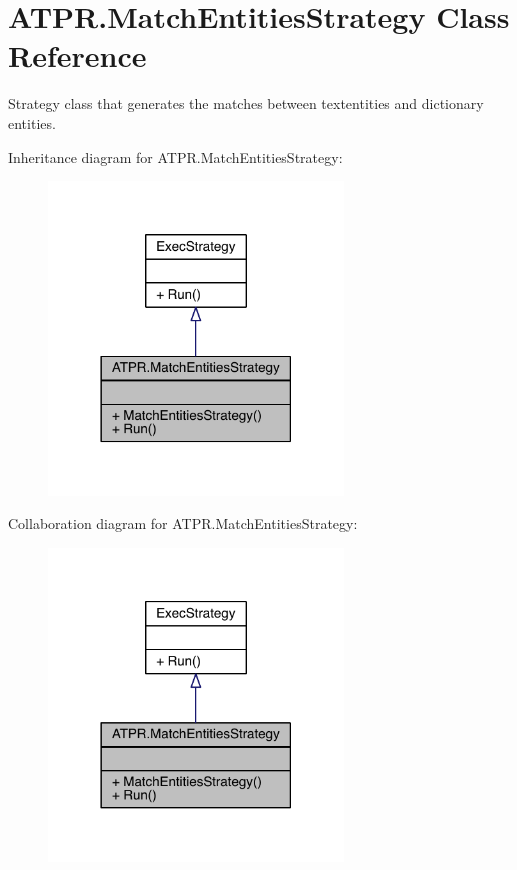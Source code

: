 \hypertarget{class_a_t_p_r_1_1_match_entities_strategy}{}\section{A\+T\+P\+R.\+Match\+Entities\+Strategy Class Reference}
\label{class_a_t_p_r_1_1_match_entities_strategy}


Strategy class that generates the matches between textentities and dictionary entities.  




Inheritance diagram for A\+T\+P\+R.\+Match\+Entities\+Strategy\+:
\nopagebreak
\begin{figure}[H]
\begin{center}
\leavevmode
\includegraphics[width=222pt]{d6/d4b/class_a_t_p_r_1_1_match_entities_strategy__inherit__graph}
\end{center}
\end{figure}


Collaboration diagram for A\+T\+P\+R.\+Match\+Entities\+Strategy\+:
\nopagebreak
\begin{figure}[H]
\begin{center}
\leavevmode
\includegraphics[width=222pt]{d9/dfa/class_a_t_p_r_1_1_match_entities_strategy__coll__graph}
\end{center}
\end{figure}
